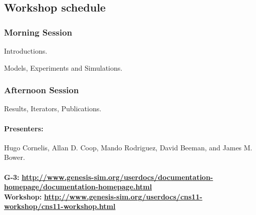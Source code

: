 \documentclass[12pt]{article}
\begin{document}
\subsection*{Workshop schedule}

\subsubsection*{Morning Session}

Introductions.

Models, Experiments and Simulations.

\subsubsection*{Afternoon Session}

Results, Iterators, Publications.


\paragraph*{Presenters:}
Hugo Cornelis, Allan D. Coop, Mando Rodriguez, David Beeman, and James M. Bower. \\

 \\
{\bf G-3:} {\scriptsize \href{http://www.genesis-sim.org/userdocs/documentation-homepage/documentation-homepage.html}{\bf http://www.genesis-sim.org/userdocs/documentation-homepage/documentation-homepage.html}} \\
{\bf Workshop:} {\scriptsize \href{http://www.genesis-sim.org/userdocs/cns11-workshop/cns11-workshop.html}{\bf http://www.genesis-sim.org/userdocs/cns11-workshop/cns11-workshop.html}}
\end{document}
